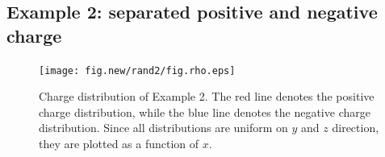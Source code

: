 \documentclass[aps,pre,preprint]{revtex4}
\renewcommand{\v}[1]{\textbf{\textit{#1}}}
\begin{document}




\subsection{Example 2: separated positive and negative charge}
\label{sec:example2}

\begin{figure}
  \centering
  \texttt{[image: fig.new/rand2/fig.rho.eps]}
  \caption{Charge distribution of Example 2. The red line
    denotes the positive charge distribution, while the blue line
    denotes the negative charge distribution. Since all distributions
    are uniform on $y$ and $z$ direction, they are plotted as a
    function of $x$.}
  \label{fig:tmp-rho2}
\end{figure}
\end{document}
